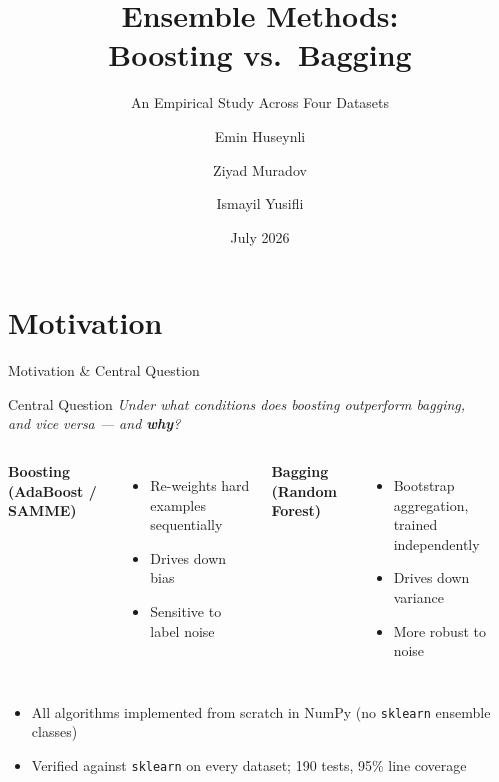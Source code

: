\documentclass[aspectratio=169,11pt]{beamer}
\title[Boosting vs.\ Bagging]{Ensemble Methods:\\Boosting vs.\ Bagging}
\subtitle{An Empirical Study Across Four Datasets}
\author[Huseynli, Muradov, Yusifli]{Emin Huseynli \and Ziyad Muradov \and Ismayil Yusifli}
\institute[AI Academy]{AI Academy -- Machine Learning Final Project, Spring 2026}
\date[July 2026]{July 2026}
\begin{document}
\begin{frame}
\titlepage
\end{frame}

\section{Motivation}
\begin{frame}{Motivation \& Central Question}
\begin{block}{Central Question}
  \centering\textit{Under what conditions does boosting outperform bagging,\\
  and vice versa --- and \textbf{why}?}
\end{block}

\bigskip
\begin{columns}
\textbf{Boosting (AdaBoost / SAMME)}
\begin{itemize}
  \item Re-weights hard examples sequentially
  \item Drives down bias
  \item Sensitive to label noise
\end{itemize}
\textbf{Bagging (Random Forest)}
\begin{itemize}
  \item Bootstrap aggregation, trained independently
  \item Drives down variance
  \item More robust to noise
\end{itemize}
\end{columns}

\bigskip
\begin{itemize}
  \item All algorithms implemented from scratch in NumPy (no \texttt{sklearn} ensemble classes)
  \item Verified against \texttt{sklearn} on every dataset; 190 tests, 95\% line coverage
\end{itemize}
\end{frame}

\end{document}
